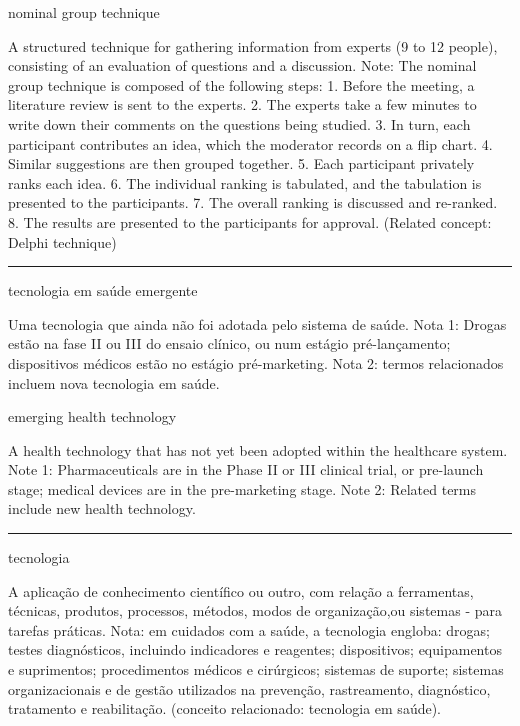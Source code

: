 \documentclass[
  openany]{book}
\begin{document}
nominal group technique

A structured technique for gathering information from experts (9 to 12 people), consisting of an evaluation of questions and a discussion. Note: The nominal group technique is composed of the following steps:
1. Before the meeting, a literature review is sent to the experts.
2. The experts take a few minutes to write down their comments on the questions being studied.
3. In turn, each participant contributes an idea, which the moderator records on a flip chart.
4. Similar suggestions are then grouped together.
5. Each participant privately ranks each idea.
6. The individual ranking is tabulated, and the tabulation is presented to the participants.
7. The overall ranking is discussed and re-ranked.
8. The results are presented to the participants for approval. (Related concept: Delphi technique)

\begin{center}\rule{0.5\linewidth}{0.5pt}\end{center}

tecnologia em saúde emergente

Uma tecnologia que ainda não foi adotada pelo sistema de saúde. Nota 1: Drogas estão na fase II ou III do ensaio clínico, ou num estágio pré-lançamento; dispositivos médicos estão no estágio pré-marketing. Nota 2: termos relacionados incluem nova tecnologia em saúde.

emerging health technology

A health technology that has not yet been adopted within the healthcare system. Note 1: Pharmaceuticals are in the Phase II or III clinical trial, or pre-launch stage; medical devices are in the pre-marketing stage. Note 2: Related terms include new health technology.

\begin{center}\rule{0.5\linewidth}{0.5pt}\end{center}

tecnologia

A aplicação de conhecimento científico ou outro, com relação a ferramentas, técnicas, produtos, processos, métodos, modos de organização,ou sistemas - para tarefas práticas. Nota: em cuidados com a saúde, a tecnologia engloba: drogas; testes diagnósticos, incluindo indicadores e reagentes; dispositivos; equipamentos e suprimentos; procedimentos médicos e cirúrgicos; sistemas de suporte; sistemas organizacionais e de gestão utilizados na prevenção, rastreamento, diagnóstico, tratamento e reabilitação. (conceito relacionado: tecnologia em saúde).
\end{document}

